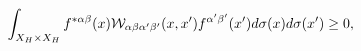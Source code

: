 \begin{equation}
\int _{X_H \times X_H}f^{*\alpha\beta}(x) {\cal
W}_{\alpha\beta\alpha'\beta'}(x,x')
f^{\alpha'\beta'}(x')d\sigma(x)d\sigma(x')\geq 0,
\end{equation}


